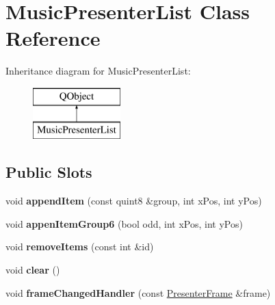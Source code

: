 \hypertarget{class_music_presenter_list}{}\section{Music\+Presenter\+List Class Reference}
\label{class_music_presenter_list}
Inheritance diagram for Music\+Presenter\+List\+:\begin{figure}[H]
\begin{center}
\leavevmode
\includegraphics[height=2.000000cm]{class_music_presenter_list}
\end{center}
\end{figure}
\subsection*{Public Slots}
\begin{DoxyCompactItemize}
\item 
\mbox{\label{class_music_presenter_list_a9e0f6ae916ed0ed8e357f33e55c22e78}} 
void {\bfseries append\+Item} (const quint8 \&group, int x\+Pos, int y\+Pos)
\item 
\mbox{\label{class_music_presenter_list_ae51493321cf61660e3469ed455c618c8}} 
void {\bfseries appen\+Item\+Group6} (bool odd, int x\+Pos, int y\+Pos)
\item 
\mbox{\label{class_music_presenter_list_a2686e66f212d6bf3c6f26a49830615c3}} 
void {\bfseries remove\+Items} (const int \&id)
\item 
\mbox{\label{class_music_presenter_list_abbc0092ee526cbf9544960b5a63c471d}} 
void {\bfseries clear} ()
\item 
\mbox{\label{class_music_presenter_list_a5d1cd3b22981c0a9baad72687e6be0c7}} 
void {\bfseries frame\+Changed\+Handler} (const \mbox{\hyperlink{struct_presenter_frame}{Presenter\+Frame}} \&frame)
\end{DoxyCompactItemize}
